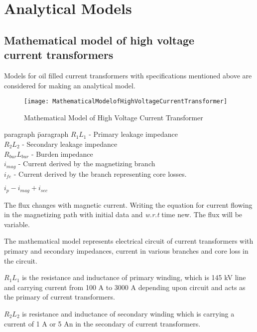 \pagebreak 
\section{Analytical Models}
\subsection[Mathematical model of high voltage current transformers]{Mathematical model of high voltage\\current transformers}
Models for oil filled current transformers with specifications mentioned above are considered for making an analytical model.

\begin{figure}[h!]
\centering
\texttt{[image: MathematicalModelofHighVoltageCurrentTransformer]}
\caption{Mathematical Model of High Voltage Current Transformer}
\label{fig:Mathematical Model of High Voltage Current Transformer}
\end{figure}

\begin{tabbing}
paragraph \quad 	\= 	paragraph \kill
$R_1 L_1$			\> - Primary leakage impedance \\
$R_2 L_2$ 			\> - Secondary leakage impedance\\
$R_{bur} L_{bur}$	\> - Burden impedance\\
$i_{mag}$			\> - Current derived by the magnetizing branch\\
$i_{fe}$			\> - Current derived by the branch representing core losses.
\end{tabbing}

$i_p - i_{mag}+ i_{sec}$

The flux changes with magnetic current. Writing the equation for current flowing in the magnetizing path with initial data and \textit{w.r.t} time new. The flux will be variable\setlength{\parskip}{1em}.

The mathematical model represents electrical circuit of current transformers with primary and secondary impedances, current in various branches and core loss in the circuit.

$R_1 L_1$ is the resistance and inductance of primary winding, which is 145 kV line and carrying current from 100 A to 3000 A depending upon circuit and acts as the primary of current transformers.

$R_2 L_2$ is resistance and inductance of secondary winding which is carrying a current of 1 A or 5 An in the secondary of current transformers.
 
